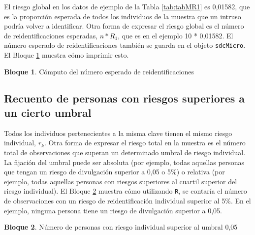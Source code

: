 \documentclass[
]{book}
\newenvironment{Shaded}{\begin{snugshade}}{\end{snugshade}}
\newcommand{\CommentTok}[1]{\textcolor[rgb]{0.56,0.35,0.01}{\textit{#1}}}
\newcommand{\NormalTok}[1]{#1}
\newcommand{\SpecialCharTok}[1]{\textcolor[rgb]{0.00,0.00,0.00}{#1}}
\theoremstyle{definition}
\theoremstyle{definition}
\newtheorem{example}{Bloque}[chapter]
\theoremstyle{definition}
\theoremstyle{definition}
\theoremstyle{remark}
\begin{document}
El riesgo global en los datos de ejemplo de la Tabla \ref{tab:tabMR1} es 0,01582, que es la proporción esperada de todos los individuos de la muestra que un intruso podría volver a identificar. Otra forma de expresar el riesgo global es el número de reidentificaciones esperadas, \(n*R_{1}\), que es en el ejemplo 10 * 0,01582. El número esperado de reidentificaciones también se guarda en el objeto \texttt{sdcMicro}. El Bloque \ref{exm:bloqueMR10} muestra cómo imprimir esto.

\begin{example}
\protect\hypertarget{exm:bloqueMR10}{}\label{exm:bloqueMR10}Cómputo del número esperado de reidentificaciones
\end{example}

\begin{Shaded}
\end{Shaded}

\hypertarget{recuento-de-personas-con-riesgos-superiores-a-un-cierto-umbral}{%
\subsection{Recuento de personas con riesgos superiores a un cierto umbral}\label{recuento-de-personas-con-riesgos-superiores-a-un-cierto-umbral}}

Todos los individuos pertenecientes a la misma clave tienen el mismo riesgo individual, \(r_{k}\). Otra forma de expresar el riesgo total en la muestra es el número total de observaciones que superan un determinado umbral de riesgo individual. La fijación del umbral puede ser absoluta (por ejemplo, todas aquellas personas que tengan un riesgo de divulgación superior a 0,05 o 5\%) o relativa (por ejemplo, todas aquellas personas con riesgos superiores al cuartil superior del riesgo individual). El Bloque \ref{exm:bloqueMR11} muestra cómo utilizando \texttt{R}, se contaría el número de observaciones con un riesgo de reidentificación individual superior al 5\%. En el ejemplo, ninguna persona tiene un riesgo de divulgación superior a 0,05.

\begin{example}
\protect\hypertarget{exm:bloqueMR11}{}\label{exm:bloqueMR11}Número de personas con riesgo individual superior al umbral 0,05
\end{example}
\end{document}
